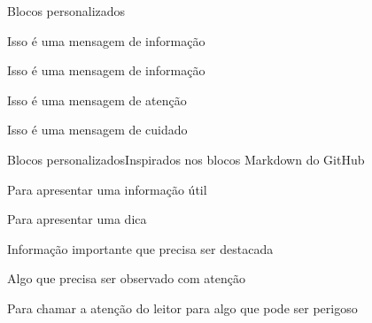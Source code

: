 \documentclass[aspectratio=169]{beamer}
\begin{document}
\begin{frame}{Blocos personalizados}

    \begin{informacao}
    Isso é uma mensagem de informação
    \end{informacao}
    
    \begin{informacaoazul}
        Isso é uma mensagem de informação
    \end{informacaoazul}

    \begin{atencao}
        Isso é uma mensagem de atenção
    \end{atencao}
    
    \begin{cuidado}
        Isso é uma mensagem de cuidado
    \end{cuidado}
\end{frame}

\begin{frame}[allowframebreaks]{Blocos personalizados}{Inspirados nos blocos Markdown do GitHub}
\begin{nota}
    Para apresentar uma informação útil
\end{nota}

\begin{tip}
    Para apresentar uma dica
\end{tip}

\begin{important}
    Informação importante que precisa ser destacada
\end{important}

\begin{warning}
    Algo que precisa ser observado com atenção
\end{warning}

\begin{caution}
    Para chamar a atenção do leitor para algo que pode ser perigoso
\end{caution}
\end{frame}
\end{document}
